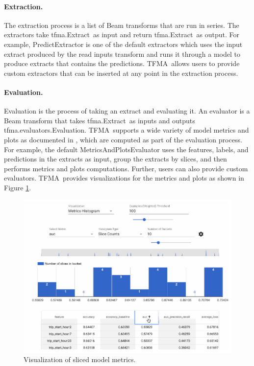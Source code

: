\documentclass[11pt]{article}
\newcommand{\tfma}{{\sf TFMA}}
\newcommand{\extract}{{\sf tfma.Extract}}
\newcommand{\evaluation}{{\sf tfma.evaluators.Evaluation}}
\begin{document}
\paragraph{Extraction.} The extraction process is a list of Beam transforms that are run in series. The extractors take \extract\ as input and return \extract\ as output. For example, PredictExtractor is one of the default extractors which uses the input extract produced by the read inputs transform and runs it through a model to produce extracts that contains the predictions. \tfma\ allows users to provide custom extractors that can be inserted at any point in the extraction process.

\paragraph{Evaluation.} Evaluation is the process of taking an extract and evaluating it. An evaluator is a Beam transform that takes \extract\ as inputs and outputs \evaluation. \tfma\ supports a wide variety of model metrics and plots as documented in \cite{tfmametrics}, which are computed as part of the evaluation process. For example, the default MetricsAndPlotsEvaluator uses the features, labels, and predictions in the extracts as input, group the extracts by slices, and then performs metrics and plots computations. Further, users can also provide custom evaluators. \tfma\ provides visualizations for the metrics and plots as shown in Figure \ref{tfmaui}.

\begin{figure}[t]
  \includegraphics[width=\linewidth]{submissions/continuous-pipelines/figs/tfma_ui.png}
  \caption{Visualization of sliced model metrics.}
  \label{tfmaui}
\vspace{-4mm}
\end{figure}
\end{document}
